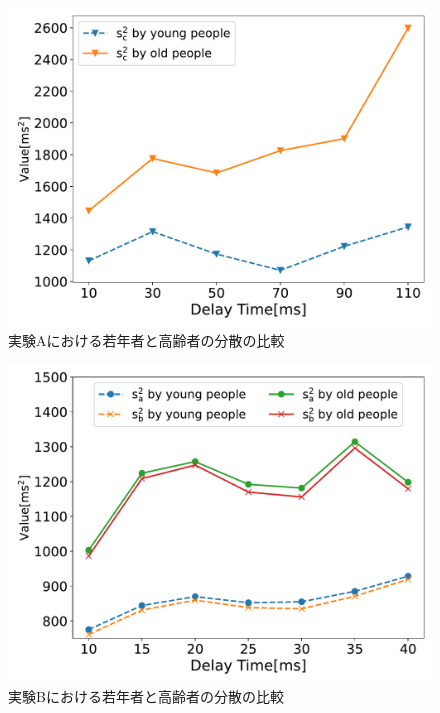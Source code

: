 \begin{figure}[tbp]
  \centering
  \includegraphics[scale=0.5]{figures/Honbann/Comparison_young_old/110_var_Sc.pdf}
  \caption{実験Aにおける若年者と高齢者の分散の比較}
  \label{fig:Var_110ms_Sc}
\end{figure}

\begin{figure}[tbp]
  \centering
  \includegraphics[scale=0.5]{figures/Honbann/Comparison_young_old/40_var_SaSb.pdf}
  \caption{実験Bにおける若年者と高齢者の分散の比較}
  \label{fig:Var_40ms_Sa_Sb}
\end{figure}

